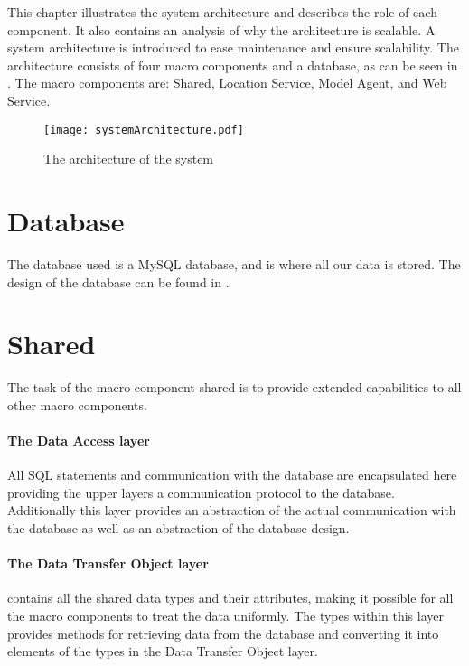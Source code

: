 This chapter illustrates the system architecture and describes the role of each component.
It also contains an analysis of why the architecture is scalable.
A system architecture is introduced to ease maintenance and ensure scalability.
The architecture consists of four macro components and a database, as can be seen in . The macro components are: Shared, Location Service, Model Agent, and Web Service.

\begin{figure}
\texttt{[image: systemArchitecture.pdf]}
\caption{The architecture of the system}
\label{fig:architecture}
\end{figure}

\section{Database} The database used is a MySQL database, and is where all our data is stored.
The design of the database can be found in .

\section{Shared}
The task of the macro component shared is to provide extended capabilities to all other macro components.

\paragraph{The Data Access layer} All SQL statements and communication with the database are encapsulated here providing the upper layers a communication protocol to the database.
Additionally this layer provides an abstraction of the actual communication with the database as well as an abstraction of the database design.

\paragraph{The Data Transfer Object layer} contains all the shared data types and their attributes, making it possible for all the macro components to treat the data uniformly.
The types within this layer provides methods for retrieving data from the database and converting it into elements of the types in the Data Transfer Object layer.

